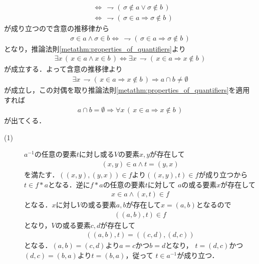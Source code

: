 \begin{prf}
\begin{align}
			&\Longleftrightarrow\, \rightharpoondown (\, \sigma \notin a \vee \sigma \notin b\, ) \\
			&\Longleftrightarrow\, \rightharpoondown (\, \sigma \in a \Longrightarrow \sigma \notin b\, )
		\end{align}
		が成り立つので含意の推移律から
		\begin{align}
			\sigma \in a \wedge \sigma \in b \Longleftrightarrow\,
			\rightharpoondown (\, \sigma \in a \Longrightarrow \sigma \notin b\, )
		\end{align}
		となり，推論法則\ref{metathm:properties_of_quantifiers}より
		\begin{align}
			\exists x\, (\, x \in a \wedge x \in b\, ) \Longleftrightarrow
			\exists x\, \rightharpoondown (\, x \in a \Longrightarrow x \notin b\, )
		\end{align}
		が成立する．よって含意の推移律より
		\begin{align}
			\exists x\, \rightharpoondown (\, x \in a \Longrightarrow x \notin b\, )
			\Longrightarrow a \cap b \neq \emptyset
		\end{align}
		が成立し，この対偶を取り推論法則\ref{metathm:properties_of_quantifiers}を適用すれば
		\begin{align}
			a \cap b = \emptyset \Longrightarrow \forall x\, (\, x \in a \Longrightarrow x \notin b\, )
		\end{align}
		が出てくる．
		\QED
	\end{prf}
	
	\begin{screen}
		\begin{thm}
			
		\end{thm}
	\end{screen}
	
	\begin{prf}\mbox{}
		\begin{description}
			\item[(1)] $a^{-1}$の任意の要素$t$に対し或る$V$の要素$x,y$が存在して
				\begin{align}
					(x,y) \in a \wedge t = (y,x)
				\end{align}
				を満たす．$((x,y),(y,x)) \in f$より$((x,y),t) \in f$が成り立つから
				$t \in f \ast a$となる．逆に$f \ast a$の任意の要素$t$に対して
				$a$の或る要素$x$が存在して
				\begin{align}
					x \in a \wedge (x,t) \in f
				\end{align}
				となる．$x$に対し$V$の或る要素$a,b$が存在して$x=(a,b)$となるので
				\begin{align}
					((a,b),t) \in f
				\end{align}
				となり，$V$の或る要素$c,d$が存在して
				\begin{align}
					((a,b),t) = ((c,d),(d,c))
				\end{align}
				となる．$(a,b) = (c,d)$より$a=c$かつ$b=d$となり，
				$t = (d,c)$かつ$(d,c)=(b,a)$より$t=(b,a)$，従って
				$t \in a^{-1}$が成り立つ．
		\end{description}
	\end{prf}